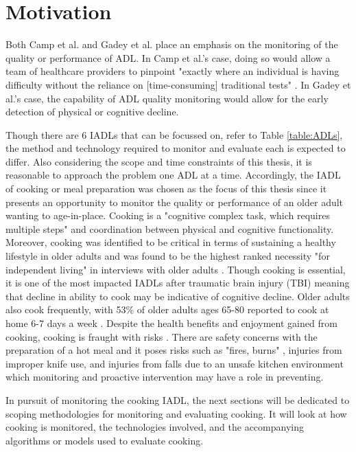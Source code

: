 \clearpage
\section{Motivation}
Both Camp et al. and Gadey et al. place an emphasis on the monitoring of the quality or performance of ADL. In Camp et al.'s case, doing so would allow a team of healthcare providers to pinpoint "exactly where an individual is having difficulty without the reliance on [time-consuming] traditional tests" \cite{camp_technology_2021}. In Gadey et al.'s case, the capability of ADL quality monitoring would allow for the early detection of physical or cognitive decline.

Though there are 6 IADLs that can be focussed on, refer to Table \ref{table:ADLs}, the method and technology required to monitor and evaluate each is expected to differ. Also considering the scope and time constraints of this thesis, it is reasonable to approach the problem one ADL at a time. Accordingly, the IADL of cooking or meal preparation was chosen as the focus of this thesis since it presents an opportunity to monitor the quality or performance of an older adult wanting to age-in-place. Cooking is a "cognitive complex task, which requires multiple steps" \cite{sikkes_qualitative_2014} and coordination between physical and cognitive functionality. Moreover, cooking was identified to be critical in terms of sustaining a healthy lifestyle in older adults \cite{bouchard_smart_2020} and was found to be the highest ranked necessity "for independent living" in interviews with older adults \cite{dubuc_perceived_2019}. Though cooking is essential, it is one of the most impacted IADLs after traumatic brain injury (TBI) meaning that decline in ability to cook may be indicative of cognitive decline. Older adults also cook frequently, with 53\% of older adults ages 65-80 reported to cook at home 6-7 days a week \cite{malani_joy_2020}. Despite the health benefits and enjoyment gained from cooking, cooking is fraught with risks \cite{yared_cooking_2015}. There are safety concerns with the preparation of a hot meal and it poses risks such as "fires, burns" \cite{dubuc_perceived_2019}, injuries from improper knife use, and injuries from falls due to an unsafe kitchen environment \cite{yared_cooking_2015} which monitoring and proactive intervention may have a role in preventing. 

In pursuit of monitoring the cooking IADL, the next sections will be dedicated to scoping methodologies for monitoring and evaluating cooking. It will look at how cooking is monitored, the technologies involved, and the accompanying algorithms or models used to evaluate cooking.

